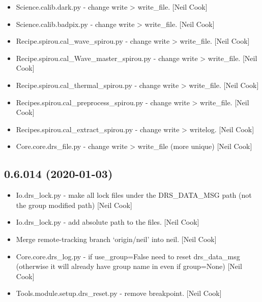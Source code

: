 \documentclass[a4paper,10pt,english]{report}
\begin{document}
\begin{itemize}
\item {} 
Science.calib.dark.py - change write \textendash{}\textgreater{} write\_file. {[}Neil Cook{]}

\item {} 
Science.calib.badpix.py - change write \textendash{}\textgreater{} write\_file. {[}Neil Cook{]}

\item {} 
Recipe.spirou.cal\_wave\_spirou.py - change write \textendash{}\textgreater{} write\_file. {[}Neil
Cook{]}

\item {} 
Recipe.spirou.cal\_Wave\_master\_spirou.py - change write \textendash{}\textgreater{} write\_file.
{[}Neil Cook{]}

\item {} 
Recipe.spirou.cal\_thermal\_spirou.py - change write \textendash{}\textgreater{} write\_file.
{[}Neil Cook{]}

\item {} 
Recipes.spirou.cal\_preprocess\_spirou.py - change write \textendash{}\textgreater{} write\_file.
{[}Neil Cook{]}

\item {} 
Recipes.spirou.cal\_extract\_spirou.py - change write \textendash{}\textgreater{} writelog.
{[}Neil Cook{]}

\item {} 
Core.core.drs\_file.py - change write \textendash{}\textgreater{} write\_file (more unique)
{[}Neil Cook{]}

\end{itemize}


\subsection{0.6.014 (2020-01-03)}
\label{\detokenize{misc/changelog:id3}}\begin{itemize}
\item {} 
Io.drs\_lock.py - make all lock files under the DRS\_DATA\_MSG path (not
the group modified path) {[}Neil Cook{]}

\item {} 
Io.drs\_lock.py - add absolute path to the files. {[}Neil Cook{]}

\item {} 
Merge remote-tracking branch ‘origin/neil’ into neil. {[}Neil Cook{]}

\item {} 
Core.core.drs\_log.py - if use\_group=False need to reset drs\_data\_msg
(otherwise it will already have group name in even if group=None)
{[}Neil Cook{]}

\item {} 
Tools.module.setup.drs\_reset.py - remove breakpoint. {[}Neil Cook{]}

\end{itemize}
\end{document}
